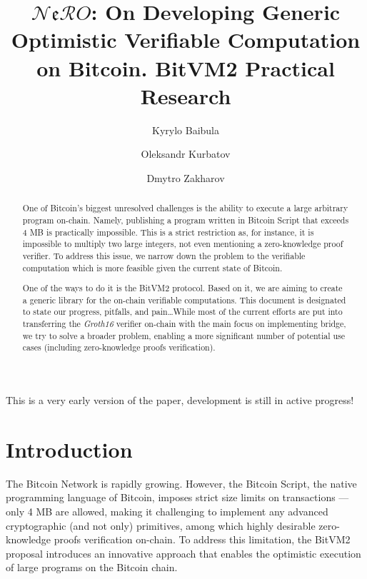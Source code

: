 \documentclass{iacrtrans}
\author{Kyrylo Baibula \inst{1} \and Oleksandr Kurbatov\inst{1} \and
Dmytro Zakharov\inst{1}}
\institute{Distributed Lab
  \email{dmytro.zakharov@distributedlab.com},
\email{ok@distributedlab.com}, \email{kyrylo.baybula@distributedlab.com}}
\title[Verifiable Computation on Bitcoin]{$\mathcal{N}\mathfrak{e}\mathcal{R}O$: On Developing Generic Optimistic Verifiable Computation on Bitcoin. BitVM2 Practical Research}
\begin{document}
\maketitle


\begin{abstract}
  One of Bitcoin's biggest unresolved challenges is the ability to execute a
  large arbitrary program on-chain. Namely, publishing a program written in
  Bitcoin Script that exceeds 4 MB is practically impossible. This is a strict
  restriction as, for instance, it is impossible to multiply two large integers,
  not even mentioning a zero-knowledge proof verifier. To address this issue, we
  narrow down the problem to the verifiable computation which is more feasible
  given the current state of Bitcoin.

  One of the ways to do it is the BitVM2 protocol. Based on it, we are aiming to
  create a generic library for the on-chain verifiable computations. This
  document is designated to state our progress, pitfalls, and pain\ldots While
  most of the current efforts are put into transferring the \textit{Groth16}
  verifier on-chain with the main focus on implementing bridge, we try to solve
  a broader problem, enabling a more significant number of potential use cases
  (including zero-knowledge proofs verification).
\end{abstract}

\setcounter{tocdepth}{2}
\tableofcontents

\begin{tcolorbox}[colback=green!15!white, halign title=flush center, colframe=green!70!black, fonttitle=\bfseries\large, title=Note, sharp corners]
  \centering This is a very early version of the paper, development is still in
  active progress!
\end{tcolorbox}

\section{Introduction}\label{sec:intro}

The Bitcoin Network \autocite{bitcoin_paper} is rapidly growing. However, the
Bitcoin Script, the native programming language of Bitcoin, imposes strict size
limits on transactions --- only 4 MB are allowed, making it challenging to
implement any advanced cryptographic (and not only) primitives, among which
highly desirable zero-knowledge proofs verification on-chain. To address this
limitation, the BitVM2 \autocite{bitvm2} proposal introduces an innovative
approach that enables the optimistic execution of large programs on the Bitcoin
chain. 
\end{document}
